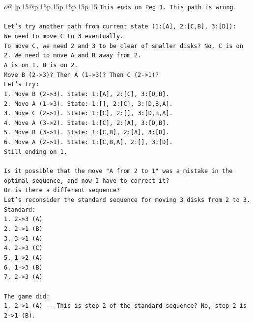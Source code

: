 \documentclass{article}
\begin{document}
{\begin{supertabular}{c@{$\;$}|p{.15\linewidth}@{}p{.15\linewidth}p{.15\linewidth}p{.15\linewidth}p{.15\linewidth}p{.15\linewidth}}
{{{\texttt{This ends on Peg 1. This path is wrong.} \\
\\ 
\texttt{Let's try another path from current state (1:{[}A{]}, 2:{[}C,B{]}, 3:{[}D{]}):} \\
\texttt{We need to move C to 3 eventually.} \\
\texttt{To move C, we need 2 and 3 to be clear of smaller disks? No, C is on 2. We need to move A and B away from 2.} \\
\texttt{A is on 1. B is on 2.} \\
\texttt{Move B (2{-}>3)? Then A (1{-}>3)? Then C (2{-}>1)?} \\
\texttt{Let's try:} \\
\texttt{1. Move B (2{-}>3). State: 1:{[}A{]}, 2:{[}C{]}, 3:{[}D,B{]}.} \\
\texttt{2. Move A (1{-}>3). State: 1:{[}{]}, 2:{[}C{]}, 3:{[}D,B,A{]}.} \\
\texttt{3. Move C (2{-}>1). State: 1:{[}C{]}, 2:{[}{]}, 3:{[}D,B,A{]}.} \\
\texttt{4. Move A (3{-}>2). State: 1:{[}C{]}, 2:{[}A{]}, 3:{[}D,B{]}.} \\
\texttt{5. Move B (3{-}>1). State: 1:{[}C,B{]}, 2:{[}A{]}, 3:{[}D{]}.} \\
\texttt{6. Move A (2{-}>1). State: 1:{[}C,B,A{]}, 2:{[}{]}, 3:{[}D{]}.} \\
\texttt{Still ending on 1.} \\
\\ 
\texttt{Is it possible that the move "A from 2 to 1" was a mistake in the optimal sequence, and now I have to correct it?} \\
\texttt{Or is there a different sequence?} \\
\texttt{Let's reconsider the standard sequence for moving 3 disks from 2 to 3.} \\
\texttt{Standard:} \\
\texttt{1. 2{-}>3 (A)} \\
\texttt{2. 2{-}>1 (B)} \\
\texttt{3. 3{-}>1 (A)} \\
\texttt{4. 2{-}>3 (C)} \\
\texttt{5. 1{-}>2 (A)} \\
\texttt{6. 1{-}>3 (B)} \\
\texttt{7. 2{-}>3 (A)} \\
\\ 
\texttt{The game did:} \\
\texttt{1. 2{-}>1 (A) {-}{-} This is step 2 of the standard sequence? No, step 2 is 2{-}>1 (B).} \\
}}}
\end{supertabular}}
\end{document}
